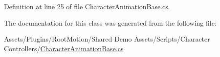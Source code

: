 Definition at line 25 of file Character\+Animation\+Base.\+cs.



The documentation for this class was generated from the following file\+:\begin{DoxyCompactItemize}
\item 
Assets/\+Plugins/\+Root\+Motion/\+Shared Demo Assets/\+Scripts/\+Character Controllers/\mbox{\hyperlink{_character_animation_base_8cs}{Character\+Animation\+Base.\+cs}}\end{DoxyCompactItemize}
